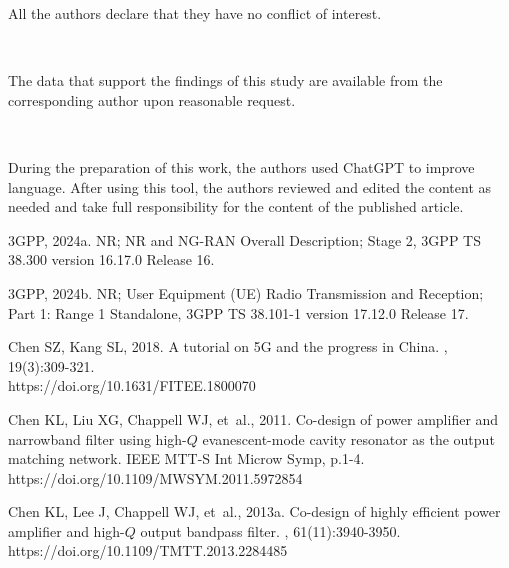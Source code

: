 \documentclass[twoside,twocolumn]{article}
\begin{document}
{

{\small All the authors declare that they have no conflict of interest.}

~

{

{\small The data that support the findings of this study are available from the corresponding author upon reasonable request.}

~

{

{\small During the preparation of this work, the authors used ChatGPT to improve language. After using this tool, the authors reviewed and edited the content as needed and take full responsibility for the content of the published article.}}


\balance


\begin{thebibliography}{}\footnotesize
\itemsep -4pt
\vspace{-8pt}

{3GPP}, 2024a.
\newblock NR; NR and NG-RAN Overall Description; Stage 2, 3GPP TS 38.300 version 16.17.0 Release 16.

{3GPP}, 2024b.
\newblock NR; User Equipment (UE) Radio Transmission and Reception; Part 1: Range 1 Standalone, 3GPP TS 38.101-1 version 17.12.0 Release 17.

Chen SZ, Kang SL, 2018.
\newblock A tutorial on 5G and the progress in China.
, 19(3):309-321. \\
  https://doi.org/10.1631/FITEE.1800070



Chen KL, Liu XG, Chappell WJ, {et~al.}, 2011.
\newblock Co-design of power amplifier and narrowband filter using high-$Q$ evanescent-mode cavity resonator as the output matching network.
\newblock IEEE MTT-S Int Microw Symp, p.1-4. \\
  https://doi.org/10.1109/MWSYM.2011.5972854

Chen KL, Lee J, Chappell WJ, {et~al.}, 2013a.
\newblock Co-design of highly efficient power amplifier and high-$Q$ output bandpass filter.
, 61(11):3940-3950. \\
  https://doi.org/10.1109/TMTT.2013.2284485


\end{thebibliography}}}
\end{document}
